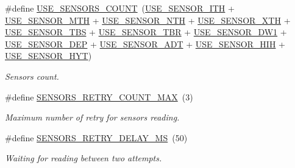 \begin{DoxyCompactItemize}
\mbox{\label{rmap-config_8h_af18dc3de744722cb308451b7a705611b}} 
\#define \hyperlink{rmap-config_8h_af18dc3de744722cb308451b7a705611b}{U\+S\+E\+\_\+\+S\+E\+N\+S\+O\+R\+S\+\_\+\+C\+O\+U\+NT}~(\hyperlink{sensors__config_8h_a22d6a7857098158d20b37de9080accb5}{U\+S\+E\+\_\+\+S\+E\+N\+S\+O\+R\+\_\+\+I\+TH} + \hyperlink{sensors__config_8h_a716f318739d3cc63bbe11a711152a93f}{U\+S\+E\+\_\+\+S\+E\+N\+S\+O\+R\+\_\+\+M\+TH} + \hyperlink{sensors__config_8h_a10ed05c0989cac98ec0dcccafe5eab2d}{U\+S\+E\+\_\+\+S\+E\+N\+S\+O\+R\+\_\+\+N\+TH} + \hyperlink{sensors__config_8h_a31485d4f9fa38af9114e6bd1455e989c}{U\+S\+E\+\_\+\+S\+E\+N\+S\+O\+R\+\_\+\+X\+TH} + \hyperlink{sensors__config_8h_a7d0abdd8465288cd55c86d95ad466cc7}{U\+S\+E\+\_\+\+S\+E\+N\+S\+O\+R\+\_\+\+T\+BS} + \hyperlink{sensors__config_8h_aba1fe603fab2f047ac3913e33b6f8cce}{U\+S\+E\+\_\+\+S\+E\+N\+S\+O\+R\+\_\+\+T\+BR} + \hyperlink{sensors__config_8h_af719cba7600d5cfeca9911fa9ac23c2d}{U\+S\+E\+\_\+\+S\+E\+N\+S\+O\+R\+\_\+\+D\+W1} + \hyperlink{sensors__config_8h_a41a207ce017a43c492f8d2a0bf11a598}{U\+S\+E\+\_\+\+S\+E\+N\+S\+O\+R\+\_\+\+D\+EP} + \hyperlink{sensors__config_8h_a34acfad25488d28951ff729ebda66311}{U\+S\+E\+\_\+\+S\+E\+N\+S\+O\+R\+\_\+\+A\+DT} + \hyperlink{sensors__config_8h_aa1d83db2373ab5e74ed832abf1b7f0ed}{U\+S\+E\+\_\+\+S\+E\+N\+S\+O\+R\+\_\+\+H\+IH} + \hyperlink{sensors__config_8h_a85f2976107ff26789b268febf87a392a}{U\+S\+E\+\_\+\+S\+E\+N\+S\+O\+R\+\_\+\+H\+YT})
\begin{DoxyCompactList}\small\item\em Sensors count. \end{DoxyCompactList}\item 
\mbox{\label{rmap-config_8h_a16fa5577ef44bb1146f17a3bc43194b1}} 
\#define \hyperlink{rmap-config_8h_a16fa5577ef44bb1146f17a3bc43194b1}{S\+E\+N\+S\+O\+R\+S\+\_\+\+R\+E\+T\+R\+Y\+\_\+\+C\+O\+U\+N\+T\+\_\+\+M\+AX}~(3)
\begin{DoxyCompactList}\small\item\em Maximum number of retry for sensors reading. \end{DoxyCompactList}\item 
\mbox{\label{rmap-config_8h_a8ea8eeea7855628652f697bab3d173b5}} 
\#define \hyperlink{rmap-config_8h_a8ea8eeea7855628652f697bab3d173b5}{S\+E\+N\+S\+O\+R\+S\+\_\+\+R\+E\+T\+R\+Y\+\_\+\+D\+E\+L\+A\+Y\+\_\+\+MS}~(50)
\begin{DoxyCompactList}\small\item\em Waiting for reading between two attempts. \end{DoxyCompactList}\item 

\end{DoxyCompactItemize}
